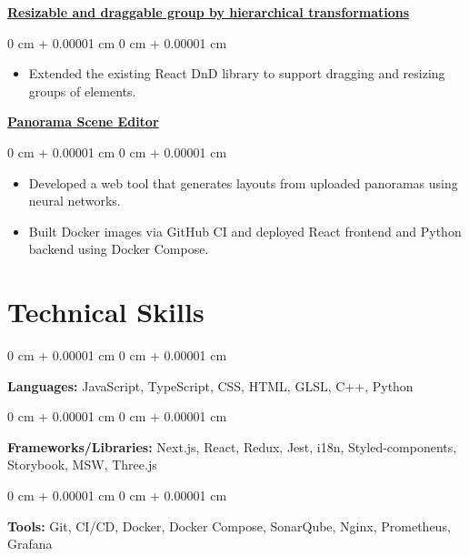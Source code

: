 \documentclass[10pt, letterpaper]{article}
\newenvironment{highlights}{
    \begin{itemize}[
        topsep=0.10 cm,
        parsep=0.10 cm,
        partopsep=0pt,
        itemsep=0pt,
        leftmargin=0 cm + 10pt
    ]
}{
    \end{itemize}
} %
\newenvironment{onecolentry}{
    \begin{adjustwidth}{
        0 cm + 0.00001 cm
    }{
        0 cm + 0.00001 cm
    }
}{
    \end{adjustwidth}
} %
\begin{document}
        \vspace{0.2 cm}

        \href{https://github.com/tsengyushiang/react-rnd-group}{\textbf{Resizable and draggable group by hierarchical transformations}}
        \vspace{0.10 cm}
        \begin{onecolentry}
            \begin{highlights}
                \item Extended the existing React DnD library to support dragging and resizing groups of elements.
            \end{highlights}
        \end{onecolentry}

        \vspace{0.2 cm}

        \href{https://github.com/tsengyushiang/pano-to-mesh}{\textbf{Panorama Scene Editor}}
        \vspace{0.10 cm}
        \begin{onecolentry}
            \begin{highlights}
                \item Developed a web tool that generates layouts from uploaded panoramas using neural networks.
                \item Built Docker images via GitHub CI and deployed React frontend and Python backend using Docker Compose.
            \end{highlights}
        \end{onecolentry}
        

    \section{Technical Skills}

        \begin{onecolentry}
            \textbf{Languages:} JavaScript, TypeScript, CSS, HTML, GLSL, C++, Python
        \end{onecolentry}

        \vspace{0.2 cm}

        \begin{onecolentry}
            \textbf{Frameworks/Libraries:} Next.js, React, Redux, Jest, i18n, Styled-components, Storybook, MSW, Three.js
        \end{onecolentry}

        \vspace{0.2 cm}

        \begin{onecolentry}
            \textbf{Tools:} Git, CI/CD, Docker, Docker Compose, SonarQube, Nginx, Prometheus, Grafana
        \end{onecolentry}
\end{document}
